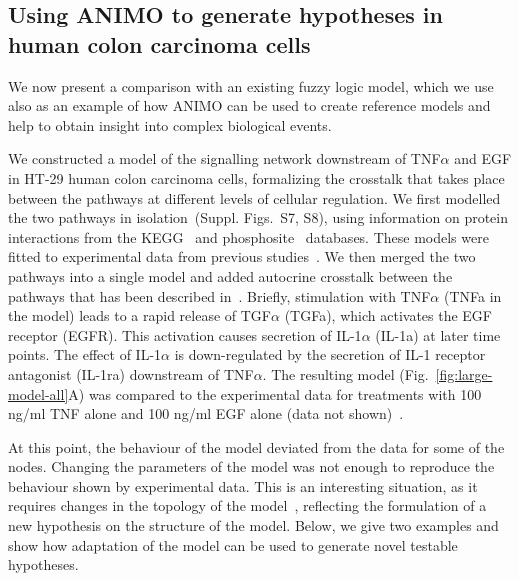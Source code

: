\documentclass{bmcart}
\begin{document}
\subsection*{Using ANIMO to generate hypotheses in human colon carcinoma cells}\label{subsec:case-study-larger}
We now present a comparison with an existing fuzzy logic model, which we use also as an example of how
ANIMO can be used to create reference models and help to obtain insight into complex biological events.

We constructed a model of the signalling network downstream of TNF$\alpha$ and EGF
in HT-29 human colon carcinoma cells, formalizing
the crosstalk that takes place between the pathways at different levels of cellular regulation.
We first modelled the two pathways in isolation~(Suppl. Figs.~S7, S8), %
using information on protein interactions from
the KEGG~\cite{kegg} and phosphosite~\cite{phosphosite} databases. These models were fitted to experimental data
from previous studies~\cite{pathway-compendium,pathway-autocrine}.
We then merged the two pathways into a single model and added autocrine crosstalk between the pathways that has been
described in~\cite{pathway-autocrine}.
Briefly, stimulation with TNF$\alpha$ ({\sf TNFa} in the model) leads to a rapid release of TGF$\alpha$ ({\sf TGFa}),
which activates the EGF receptor ({\sf EGFR}).
This activation causes secretion of IL-1$\alpha$ ({\sf IL-1a}) at later time points.
The effect of IL-1$\alpha$ is down-regulated by the secretion of IL-1 receptor antagonist ({\sf IL-1ra})
downstream of TNF$\alpha$.
The resulting model (Fig.~\ref{fig:large-model-all}A) was compared to the experimental data
for treatments with 100 ng/ml TNF alone and 100 ng/ml EGF alone (data not shown)~\cite{pathway-compendium}.




At this point, the behaviour of the model deviated from the data for some of the nodes.
Changing the parameters of the model was not enough to reproduce the behaviour shown by experimental
data. This is an interesting situation, as it requires changes in the topology of
the model~\cite{animo-syncop}, reflecting the formulation of a new hypothesis
on the structure of the model. Below, we give two examples and show how
adaptation of the model can be used to generate novel testable hypotheses.
\end{document}
